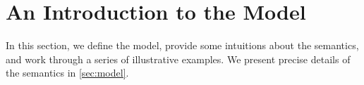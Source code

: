 \section{An Introduction to the Model}
\label{sec:model:intro}

\begin{comment}
https://preshing.com/20131125/acquire-and-release-fences-dont-work-the-way-youd-expect/

Cannot encode R/A actions with actions+fences...

A release operation prevents preceding memory operations from being delayed
past it (a;Rel =/=> Rel;a)
 
A release fence prevents preceding memory operations from being delayed past
subsequent writes (a;FR;w =/=> w;a;FR)

An acquire operation prevents subsequent memory operations from being advanced
before it (Acq;a =/=> a;Acq)

An acquire fence prevents subsequent memory operations from being advanced
before prior reads (r;FA;a =/=> FA;a;r)

https://www.modernescpp.com/index.php/fences-as-memory-barriers

StoreLoad: Full fence allows a store before to be reordered with respect to a
load after (wx;F;ry) ===> (ry;F;wx)

StoreLoad+LoadLoad: Release fence also allows (rx;FR;ry) ===> (ry;FR;rx)

StoreLoad+StoreStore: Acquire fence also allows (wx;FR;wy) ===> (wy;FR;wx)

LoadStore: No fence allows a prior load to reorder w.r.t. a subsequent store
(rx;FR;wy) =/=> (wy;FR;rx)

https://preshing.com/20120710/memory-barriers-are-like-source-control-operations/
Good news is that a fullFence does it.

Bizarrely, it seems this is not supported in C++... You have to go to assembly.
\end{comment}


In this section, we define the model, provide some intuitions about the
semantics, and work through a series of illustrative examples.  We present
precise details of the semantics in \textsection\ref{sec:model}.


